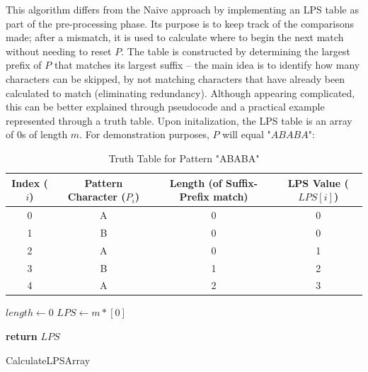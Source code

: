 \documentclass[12pt]{article}
\begin{document}
\parencite{2} \parencite{9} This algorithm differs from the Naive approach by implementing an LPS table
as part of the pre-processing phase. Its purpose is to keep track of the comparisons made;
after a mismatch, it is used to calculate where to begin the next match without needing
to reset $P$. The table is constructed by determining the largest prefix of $P$ that matches
its largest suffix -- the main idea is to identify how many characters can be skipped, by not
matching characters that have already been calculated to match (eliminating redundancy).
Although appearing complicated, this can be better explained through pseudocode and a
practical example represented through a truth table. Upon initalization, the LPS table is
an array of 0s of length $m$. For demonstration purposes, $P$ will equal "$ABABA$":

\begin{table}[!htbp]
    \centering
    \begin{tabular}{|c|c|c|c|}
        \hline
        Index ($i$) & Pattern Character ($P_{i}$) & Length (of Suffix-Prefix match) & LPS Value ($LPS[i]$) \\
        \hline
        0 & A & 0 & 0 \\
        1 & B & 0 & 0 \\
        2 & A & 0 & 1 \\
        3 & B & 1 & 2 \\
        4 & A & 2 & 3 \\
        \hline
    \end{tabular}
    \caption{Truth Table for Pattern "ABABA"}
\end{table}

\begin{center}
\begin{singlespace}
\begin{minipage}{0.75\linewidth}
\begin{algorithm}[H]
	$length \leftarrow 0$ \;
	$LPS \leftarrow m * [0]$ \;

	\bigskip


	\textbf{return} $LPS$
	\caption{CalculateLPSArray}
\end{algorithm}
\end{minipage}
\end{singlespace}
\end{center}
\end{document}
